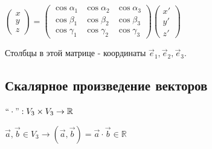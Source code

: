 \begin{enumerate}[label=\alph*)]
\begin{itemize}
                    \(\begin{pmatrix}
                        x \\
                        y \\
                        z
                    \end{pmatrix} =
                    \begin{pmatrix}
                        \cos\alpha_1 & \cos\alpha_2 & \cos\alpha_3 \\
                        \cos\beta_1  & \cos\beta_2  & \cos\beta_3  \\
                        \cos\gamma_1 & \cos\gamma_2 & \cos\gamma_3
                    \end{pmatrix}
                    \begin{pmatrix}
                        x' \\
                        y' \\
                        z'
                    \end{pmatrix}\)

                    Столбцы в этой матрице - координаты \(\vec e_1, \vec e_2, \vec e_3\).
          \end{itemize}
\end{enumerate}


\newpage
\subsection{Скалярное произведение векторов}

\(``\cdot": V_3 \times V_3 \rightarrow \mathbb{R}\)

\(\vec a, \vec b \in V_3 \rightarrow (\vec a, \vec b) = \vec a \cdot \vec b \in \mathbb{R}\)

